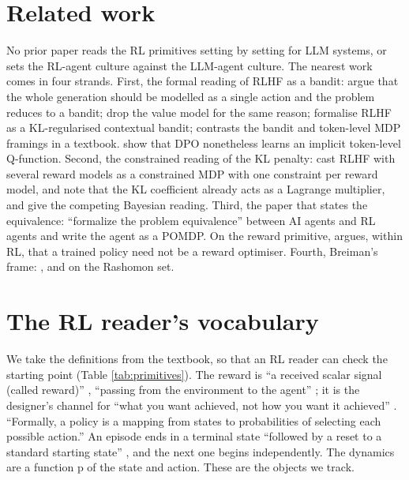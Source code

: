 \documentclass{article}
\begin{document}
\hypertarget{sec:related}{%
\section{Related work}\label{sec:related}}

No prior paper reads the RL primitives setting by setting for LLM systems, or sets the RL-agent culture against the LLM-agent culture. The nearest work comes in four strands. First, the formal reading of RLHF as a bandit: \citet{ahmadian2024} argue that the whole generation should be modelled as a single action and the problem reduces to a bandit; \citet{li2024} drop the value model for the same reason; \citet{xiong2024} formalise RLHF as a KL-regularised contextual bandit; \citet{lambert2025} contrasts the bandit and token-level MDP framings in a textbook. \citet{rafailov2024} show that DPO nonetheless learns an implicit token-level Q-function. Second, the constrained reading of the KL penalty: \citet{moskovitz2024} cast RLHF with several reward models as a constrained MDP with one constraint per reward model, and note that the KL coefficient already acts as a Lagrange multiplier, and \citet{korbak2022} give the competing Bayesian reading. Third, the paper that states the equivalence: \citet{mclean2026} ``formalize the problem equivalence'' \citep{mclean2026} between AI agents and RL agents and write the agent as a POMDP. On the reward primitive, \citet{turner2022b} argues, within RL, that a trained policy need not be a reward optimiser. Fourth, Breiman's frame: \citet{breiman2001}, and \citet{damour2021} on the Rashomon set.

\hypertarget{sec:vocab}{%
\section{The RL reader's vocabulary}\label{sec:vocab}}

We take the definitions from the textbook, so that an RL reader can check the starting point (Table \ref{tab:primitives}). The reward is ``a received scalar signal (called reward)'' \citep{sutton2018}, ``passing from the environment to the agent'' \citep{sutton2018}; it is the designer's channel for ``what you want achieved, not how you want it achieved'' \citep{sutton2018}. ``Formally, a policy is a mapping from states to probabilities of selecting each possible action.'' \citep{sutton2018} An episode ends in a terminal state ``followed by a reset to a standard starting state'' \citep{sutton2018}, and the next one begins independently. The dynamics are a function p of the state and action. These are the objects we track.
\end{document}
